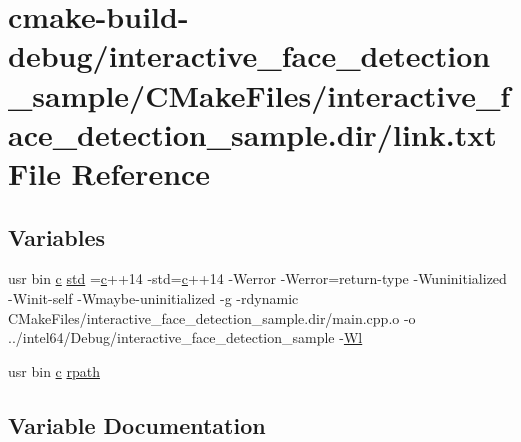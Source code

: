 \hypertarget{interactive__face__detection__sample_2CMakeFiles_2interactive__face__detection__sample_8dir_2link_8txt}{}\section{cmake-\/build-\/debug/interactive\+\_\+face\+\_\+detection\+\_\+sample/\+C\+Make\+Files/interactive\+\_\+face\+\_\+detection\+\_\+sample.dir/link.txt File Reference}
\label{interactive__face__detection__sample_2CMakeFiles_2interactive__face__detection__sample_8dir_2link_8txt}
\subsection*{Variables}
\begin{DoxyCompactItemize}
\item 
usr bin \hyperlink{CMakeCache_8txt_aac1d6a1710812201527c735f7c6afbaa}{c} \hyperlink{interactive__face__detection__sample_2CMakeFiles_2interactive__face__detection__sample_8dir_2link_8txt_a1ccfea5f558575a112db71eeb271fabf}{std} =\hyperlink{CMakeCache_8txt_aac1d6a1710812201527c735f7c6afbaa}{c}++14 -\/std=\hyperlink{CMakeCache_8txt_aac1d6a1710812201527c735f7c6afbaa}{c}++14 -\/Werror -\/Werror=return-\/type -\/Wuninitialized -\/Winit-\/self -\/Wmaybe-\/uninitialized -\/g -\/rdynamic C\+Make\+Files/interactive\+\_\+face\+\_\+detection\+\_\+sample.\+dir/main.\+cpp.\+o -\/o ../intel64/Debug/interactive\+\_\+face\+\_\+detection\+\_\+sample -\/\hyperlink{thirdparty_2extension_2CMakeFiles_2cpu__extension_8dir_2link_8txt_af9ccbf658ed2deb89d0d79f211e5b033}{Wl}
\item 
usr bin \hyperlink{CMakeCache_8txt_aac1d6a1710812201527c735f7c6afbaa}{c} \hyperlink{interactive__face__detection__sample_2CMakeFiles_2interactive__face__detection__sample_8dir_2link_8txt_ab9d7fd7120fafa2118a4e08c1df697c7}{rpath}
\end{DoxyCompactItemize}


\subsection{Variable Documentation}
